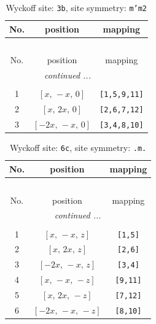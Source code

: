 \documentclass[fleqn,8pt]{jsarticle}
\begin{document}
\begin{longtable}{ccc}
\caption{Wyckoff site: {\tt 3b}, site symmetry: {\tt m'm2}}
 \\
 \hline \hline
No. & position & mapping \\ \hline \endfirsthead

\multicolumn{2}{l}{\tablename\ \thetable{}} \\
 \hline \hline
No. & position & mapping \\ \hline \endhead

 \hline \hline
\multicolumn{2}{r}{\footnotesize\it continued ...} \\ \endfoot

 \hline \hline
\multicolumn{2}{r}{} \\ \endlastfoot

1 & $\left[ x,\, - x,\, 0 \right]$ & {\tt [1,5,9,11]} \\ \hline
2 & $\left[ x,\, 2 x,\, 0 \right]$ & {\tt [2,6,7,12]} \\ \hline
3 & $\left[ - 2 x,\, - x,\, 0 \right]$ & {\tt [3,4,8,10]} \\
\end{longtable}
\renewcommand{\arraystretch}{1.2}
\begin{longtable}{ccc}
\caption{Wyckoff site: {\tt 6c}, site symmetry: {\tt .m.}}
 \\
 \hline \hline
No. & position & mapping \\ \hline \endfirsthead

\multicolumn{2}{l}{\tablename\ \thetable{}} \\
 \hline \hline
No. & position & mapping \\ \hline \endhead

 \hline \hline
\multicolumn{2}{r}{\footnotesize\it continued ...} \\ \endfoot

 \hline \hline
\multicolumn{2}{r}{} \\ \endlastfoot

1 & $\left[ x,\, - x,\, z \right]$ & {\tt [1,5]} \\ \hline
2 & $\left[ x,\, 2 x,\, z \right]$ & {\tt [2,6]} \\ \hline
3 & $\left[ - 2 x,\, - x,\, z \right]$ & {\tt [3,4]} \\ \hline
4 & $\left[ x,\, - x,\, - z \right]$ & {\tt [9,11]} \\ \hline
5 & $\left[ x,\, 2 x,\, - z \right]$ & {\tt [7,12]} \\ \hline
6 & $\left[ - 2 x,\, - x,\, - z \right]$ & {\tt [8,10]} \\
\end{longtable}
\end{document}
